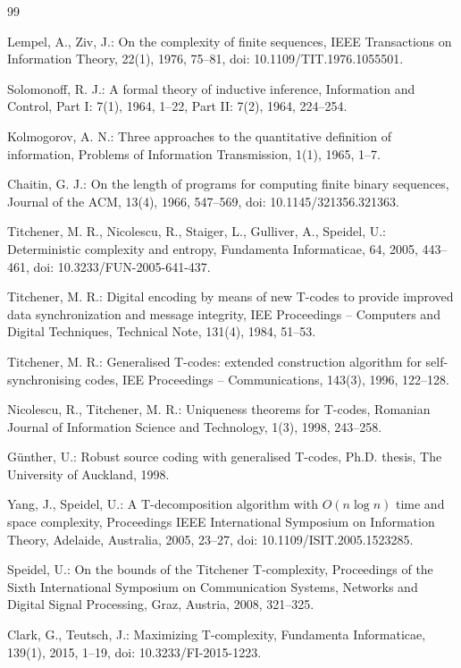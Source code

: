 \documentclass[11pt]{article}
\begin{document}
\begin{thebibliography}{99}

Lempel, A., Ziv, J.: On the complexity of finite sequences, IEEE Transactions on Information Theory, 22(1), 1976, 75--81, doi: 10.1109/TIT.1976.1055501.

Solomonoff, R. J.: A formal theory of inductive inference, Information and Control, Part I: 7(1), 1964, 1--22, Part II: 7(2), 1964, 224--254.

Kolmogorov, A. N.: Three approaches to the quantitative definition of information, Problems of Information Transmission, 1(1), 1965, 1--7.

Chaitin, G. J.: On the length of programs for computing finite binary sequences, Journal of the ACM, 13(4), 1966, 547--569, doi: 10.1145/321356.321363.

Titchener, M. R., Nicolescu, R., Staiger, L., Gulliver, A., Speidel, U.: Deterministic complexity and entropy, Fundamenta Informaticae, 64, 2005, 443--461, doi: 10.3233/FUN-2005-641-437.

Titchener, M. R.: Digital encoding by means of new T-codes to provide improved data synchronization and message integrity, IEE Proceedings -- Computers and Digital Techniques, Technical Note, 131(4), 1984, 51--53.

Titchener, M. R.: Generalised T-codes: extended construction algorithm for self-synchronising codes, IEE Proceedings -- Communications, 143(3), 1996, 122--128.

Nicolescu, R., Titchener, M. R.: Uniqueness theorems for T-codes, Romanian Journal of Information Science and Technology, 1(3), 1998, 243--258.

G\"unther, U.: Robust source coding with generalised T-codes, Ph.D. thesis, The University of Auckland, 1998.

Yang, J., Speidel, U.: A T-decomposition algorithm with $O(n\log n)$ time and space complexity, Proceedings IEEE International Symposium on Information Theory, Adelaide, Australia, 2005, 23--27, doi: 10.1109/ISIT.2005.1523285.

Speidel, U.: On the bounds of the Titchener T-complexity, Proceedings of the Sixth International Symposium on Communication Systems, Networks and Digital Signal Processing, Graz, Austria, 2008, 321--325.

Clark, G., Teutsch, J.: Maximizing T-complexity, Fundamenta Informaticae, 139(1), 2015, 1--19, doi: 10.3233/FI-2015-1223.

\end{thebibliography}
\end{document}
